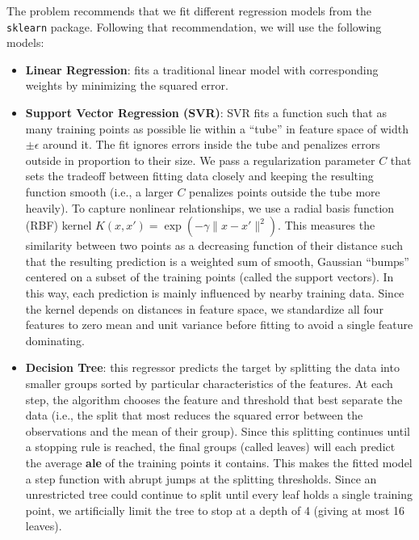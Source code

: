 \documentclass[11pt]{article}
\begin{document}
The problem recommends that we fit different regression models from the \texttt{sklearn} package. Following that recommendation, we will use the following models:
\begin{itemize}
    \item \textbf{Linear Regression}: fits a traditional linear model with corresponding weights by minimizing the squared error.
 
    \item \textbf{Support Vector Regression (SVR)}: SVR fits a function such that as many training points as possible lie within a ``tube'' in feature space of width $\pm\epsilon$ around it. The fit ignores errors inside the tube and penalizes errors outside in proportion to their size. We pass a regularization parameter $C$ that sets the tradeoff between fitting data closely and keeping the resulting function smooth (i.e., a larger $C$ penalizes points outside the tube more heavily). To capture nonlinear relationships, we use a radial basis function (RBF) kernel $K(x, x') = \exp\!\left(-\gamma \lVert x - x' \rVert^2\right)$. This measures the similarity between two points as a decreasing function of their distance such that the resulting prediction is a weighted sum of smooth, Gaussian ``bumps'' centered on a subset of the training points (called the support vectors). In this way, each prediction is mainly influenced by nearby training data. Since the kernel depends on distances in feature space, we standardize all four features to zero mean and unit variance before fitting to avoid a single feature dominating.
 
    \item \textbf{Decision Tree}: this regressor predicts the target by splitting the data into smaller groups sorted by particular characteristics of the features. At each step, the algorithm chooses the feature and threshold that best separate the data (i.e., the split that most reduces the squared error between the observations and the mean of their group). Since this splitting continues until a stopping rule is reached, the final groups (called leaves) will each predict the average \textbf{ale} of the training points it contains. This makes the fitted model a step function with abrupt jumps at the splitting thresholds. Since an unrestricted tree could continue to split until every leaf holds a single training point, we artificially limit the tree to stop at a depth of 4 (giving at most 16 leaves).
 

\end{itemize}
\end{document}
